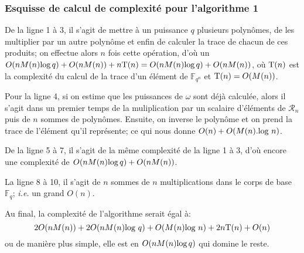 \documentclass[a4paper]{article} %
\numberwithin{equation}{section}
\newcommand\GF[1]{\mathbb{F}_{#1}}
\begin{document}
\subsubsection*{Esquisse de calcul de complexité pour l'algorithme 1}
De la ligne 1 à 3, il s'agit de mettre à un puissance $q$ plusieurs polynômes, de les multiplier par un autre polynôme et enfin de calculer la trace de chacun de ces produits; on effectue alors $n$ fois cette opération, d'où un $O(nM(n)\textup{log}\,q) + O(nM(n)) + n\textup{T}(n) = O(nM(n)\textup{log}\,q) + O(nM(n))$, où $\textup{T}(n)$ est la complexité du calcul de la trace d'un élément de $\GF{q^n}$ et $\textup{T}(n) = O(M(n))$.\par
Pour la ligne 4, si on estime que les puissances de $\omega$ sont déjà calculée, alors il s'agit dans un premier temps de la muliplication par un scalaire d'éléments de $\mathcal{R}_n$ puis de $n$ sommes de polynômes. Ensuite, on inverse le polynôme et on prend la trace de l'élément qu'il représente; ce qui nous donne $O(n) + O(M(n).\textup{log }n)$.\par 
De la ligne 5 à 7, il s'agit de la même complexité de la ligne 1 à 3, d'où encore une complexité de $O(nM(n)\textup{log}\,q) + O(nM(n))$.\par
La ligne 8 à 10, il s'agit de $n$ sommes de $n$ multiplications dans le corps de base $\GF{q}$; \textit{i.e.} un grand $O(n)$.\par
Au final, la complexité de l'algorithme serait égal à:
 \[2O(nM(n)) + 2O(nM(n)\textup{log }q) +  O(M(n)\textup{log }n) + 2n\textup{T}(n) + O(n)\] 
ou de manière plus simple, elle est en $O(nM(n)\textup{log}\,q)$ qui domine le reste.
\end{document}

